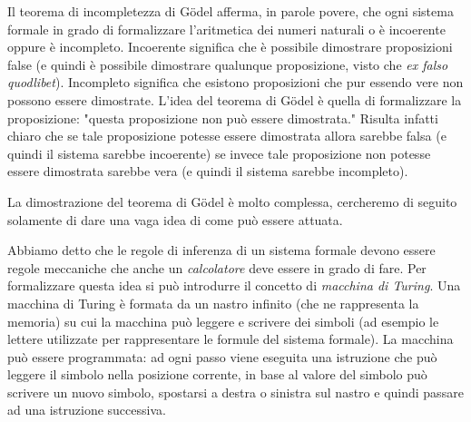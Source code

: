\documentclass[italian,a4paper,hidelinks,headinclude]{scrartcl}
\begin{document}
Il teorema di incompletezza di G\"odel afferma, in parole
povere, che ogni sistema formale in grado di formalizzare
l'aritmetica dei numeri naturali o è incoerente oppure
è incompleto. Incoerente significa che è possibile dimostrare
proposizioni false (e quindi è possibile dimostrare qualunque
proposizione, visto che \emph{ex falso quodlibet}).
Incompleto significa che esistono proposizioni che pur essendo
vere non possono essere dimostrate.
L'idea del teorema di G\"odel è quella di formalizzare
la proposizione: "questa proposizione non può essere dimostrata."
Risulta infatti chiaro che se tale proposizione potesse
essere dimostrata allora sarebbe falsa (e quindi il sistema
sarebbe incoerente) se invece tale proposizione non potesse
essere dimostrata sarebbe vera (e quindi il sistema
sarebbe incompleto).

La dimostrazione del teorema di G\"odel è molto complessa,
cercheremo di seguito solamente di dare una vaga idea
di come può essere attuata.

Abbiamo detto che le regole di inferenza di un sistema formale
devono essere regole meccaniche che anche un
\emph{calcolatore} deve essere in grado di fare.
Per formalizzare questa idea si può introdurre il concetto
di \emph{macchina di Turing}.
Una macchina di Turing è formata da un nastro infinito
(che ne rappresenta la memoria) su cui la macchina può
leggere e scrivere dei simboli (ad esempio le lettere
utilizzate per rappresentare le formule del sistema formale).
La macchina può essere programmata: ad ogni passo
viene eseguita una istruzione che può leggere il simbolo
nella posizione corrente, in base al valore del simbolo
può scrivere un nuovo simbolo, spostarsi a destra o sinistra
sul nastro
e quindi passare ad una istruzione successiva.
\end{document}
